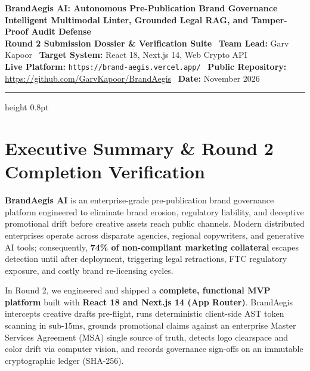 \documentclass[10pt,a4paper]{article}
\begin{document}

\begin{center}
  {\LARGE \textbf{\color{primarydark}BrandAegis AI: Autonomous Pre-Publication Brand Governance}}\\[0.1cm]
  {\large \textbf{\color{brandblue}Intelligent Multimodal Linter, Grounded Legal RAG, and Tamper-Proof Audit Defense}}\\[0.1cm]
  {\small \textbf{Round 2 Submission Dossier \& Verification Suite} \textbar\ \textbf{Team Lead:} Garv Kapoor \textbar\ \textbf{Target System:} React 18, Next.js 14, Web Crypto API}\\[0.05cm]
  {\footnotesize \textbf{Live Platform:} \texttt{https://brand-aegis.vercel.app/} \textbar\ \textbf{Public Repository:} \href{https://github.com/GarvKapoor/BrandAegis}{https://github.com/GarvKapoor/BrandAegis} \textbar\ \textbf{Date:} November 2026}
\end{center}
\vspace{-0.35cm}
\hrule height 0.8pt
\vspace{0.25cm}

\section{Executive Summary \& Round 2 Completion Verification}
\textbf{BrandAegis AI} is an enterprise-grade pre-publication brand governance platform engineered to eliminate brand erosion, regulatory liability, and deceptive promotional drift before creative assets reach public channels. Modern distributed enterprises operate across disparate agencies, regional copywriters, and generative AI tools; consequently, \textbf{74\% of non-compliant marketing collateral} escapes detection until after deployment, triggering legal retractions, FTC regulatory exposure, and costly brand re-licensing cycles.

In Round 2, we engineered and shipped a \textbf{complete, functional MVP platform} built with \textbf{React 18 and Next.js 14 (App Router)}. BrandAegis intercepts creative drafts pre-flight, runs deterministic client-side AST token scanning in sub-15ms, grounds promotional claims against an enterprise Master Services Agreement (MSA) single source of truth, detects logo clearspace and color drift via computer vision, and records governance sign-offs on an immutable cryptographic ledger (SHA-256).
\end{document}
